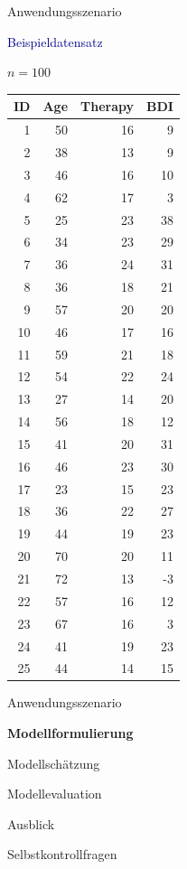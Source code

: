 \documentclass[
  8pt,
  ignorenonframetext,
]{beamer}
\begin{document}
\begin{frame}{Anwendungsszenario}
\protect\hypertarget{anwendungsszenario-1}{}
\normalsize

\textcolor{darkblue}{Beispieldatensatz}

\small

\(n = 100\)

\footnotesize
{}

\begin{longtable}[]{@{}rrrr@{}}
\toprule
ID & Age & Therapy & BDI \\
\midrule
\endhead
1 & 50 & 16 & 9 \\
2 & 38 & 13 & 9 \\
3 & 46 & 16 & 10 \\
4 & 62 & 17 & 3 \\
5 & 25 & 23 & 38 \\
6 & 34 & 23 & 29 \\
7 & 36 & 24 & 31 \\
8 & 36 & 18 & 21 \\
9 & 57 & 20 & 20 \\
10 & 46 & 17 & 16 \\
11 & 59 & 21 & 18 \\
12 & 54 & 22 & 24 \\
13 & 27 & 14 & 20 \\
14 & 56 & 18 & 12 \\
15 & 41 & 20 & 31 \\
16 & 46 & 23 & 30 \\
17 & 23 & 15 & 23 \\
18 & 36 & 22 & 27 \\
19 & 44 & 19 & 23 \\
20 & 70 & 20 & 11 \\
21 & 72 & 13 & -3 \\
22 & 57 & 16 & 12 \\
23 & 67 & 16 & 3 \\
24 & 41 & 19 & 23 \\
25 & 44 & 14 & 15 \\
\bottomrule
\end{longtable}
\end{frame}

\begin{frame}{}
\protect\hypertarget{section-5}{}
\large
{}
\vfill

Anwendungsszenario

\textbf{Modellformulierung}

Modellschätzung

Modellevaluation

Ausblick

Selbstkontrollfragen \vfill
\end{frame}
\end{document}
